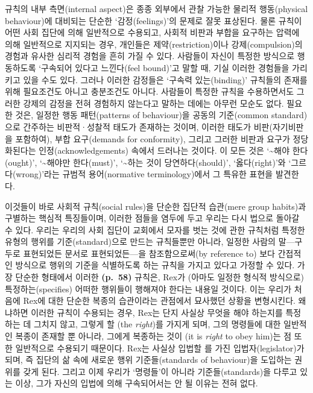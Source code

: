 규칙의 내부 측면(internal aspect)은 종종 외부에서 관찰 가능한 물리적
행동(physical behaviour)에 대비되는 단순한 ‘감정(feelings)’의 문제로
잘못 표상된다. 물론 규칙이 어떤 사회 집단에 의해 일반적으로 수용되고,
사회적 비판과 부합을 요구하는 압력에 의해 일반적으로 지지되는 경우,
개인들은 제약(restriction)이나 강제(compulsion)의 경험과 유사한 심리적
경험을 흔히 가질 수 있다. 사람들이 자신이 특정한 방식으로 행동하도록
‘구속되어 있다고 느낀다(feel bound)’고 말할 때, 기실 이러한 경험들을
가리키고 있을 수도 있다. 그러나 이러한 감정들은 ‘구속력 있는(binding)’
규칙들의 존재를 위해 필요조건도 아니고 충분조건도 아니다. 사람들이
특정한 규칙을 수용하면서도 그러한 강제의 감정을 전혀 경험하지 않는다고
말하는 데에는 아무런 모순도 없다. 필요한 것은, 일정한 행동 패턴(patterns
of behaviour)을 공동의 기준(common standard)으로 간주하는 비판적·성찰적
태도가 존재하는 것이며, 이러한 태도가 비판(자기비판을 포함하여), 부합
요구(demands for conformity), 그리고 그러한 비판과 요구가 정당화된다는
인정(acknowledgements) 속에서 드러나는 것이다. 이 모든 것은
‘\textasciitilde 해야 한다(ought)’, ‘\textasciitilde 해야만 한다(must)’,
‘\textasciitilde 하는 것이 당연하다(should)’, ‘옳다(right)’와
‘그르다(wrong)’라는 규범적 용어(normative terminology)에서 그 특유한
표현을 발견한다.

이것들이 바로 사회적 규칙(social rules)을 단순한 집단적 습관(mere group
habits)과 구별하는 핵심적 특징들이며, 이러한 점들을 염두에 두고 우리는
다시 법으로 돌아갈 수 있다. 우리는 우리의 사회 집단이 교회에서 모자를
벗는 것에 관한 규칙처럼 특정한 유형의 행위를 기준(standard)으로 만드는
규칙들뿐만 아니라, 일정한 사람의 말---구두로 표현되었든 문서로
표현되었든---을 참조함으로써(by reference to) 보다 간접적인 방식으로
행위의 기준을 식별하도록 하는 규칙을 가지고 있다고 가정할 수 있다. 가장
단순한 형태에서 이러한 \textbf{(p.~58)} 규칙은, Rex가 (아마도 일정한
형식적 방식으로) 특정하는(specifies) 어떠한 행위들이 행해져야 한다는
내용일 것이다. 이는 우리가 처음에 Rex에 대한 단순한 복종의 습관이라는
관점에서 묘사했던 상황을 변형시킨다. 왜냐하면 이러한 규칙이 수용되는
경우, Rex는 단지 사실상 무엇을 해야 하는지를 특정하는 데 그치지 않고,
그렇게 할 (the \emph{right})를 가지게 되며, 그의 명령들에
대한 일반적인 복종이 존재할 뿐 아니라, 그에게 복종하는 것이
(it is \emph{right} to obey him)는 점 또한 일반적으로
수용되기 때문이다. Rex는 사실상 입법할 를 가진
입법자(legislator)가 되며, 즉 집단의 삶 속에 새로운 행위
기준들(standards of behaviour)을 도입하는 권위를 갖게 된다. 그리고 이제
우리가 ‘명령들’이 아니라 기준들(standards)을 다루고 있는 이상, 그가
자신의 입법에 의해 구속되어서는 안 될 이유는 전혀 없다.

